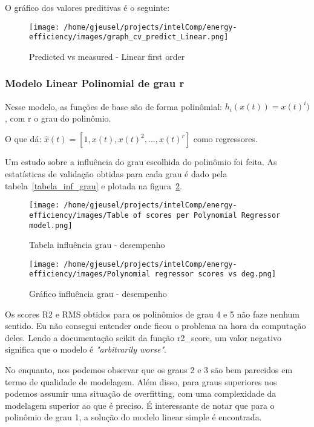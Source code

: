 \documentclass[paper=a4, fontsize=11pt]{article} %
\numberwithin{equation}{section} %
\numberwithin{figure}{section} %
\numberwithin{table}{section} %
\begin{document}
O gráfico dos valores preditivas é o seguinte:
\begin{figure}[H] %
\begin{center}
\texttt{[image: /home/gjeusel/projects/intelComp/energy-efficiency/images/graph\_cv\_predict\_Linear.png]}
\end{center}
\caption{Predicted vs measured - Linear first order}
\label{PvsM_Linear_First_Order}
\end{figure}

\subsubsection{Modelo Linear Polinomial de grau r}
Nesse modelo, as funções de base são de forma polinômial: $h_i(x(t)) = x(t)^{i})$, com r o grau do polinômio.

O que dá: $\hat{x}(t) = [1, x(t), x(t)^{2}, ..., x(t)^{r}]$ como regressores.

Um estudo sobre a influência do grau escolhida do polinômio foi feita.
As estatísticas de validação obtidas para cada grau é dado pela tabela~\ref{tabela_inf_grau} e plotada na figura~\ref{graph_inf_grau}.\newline

\begin{figure}[H] %
\begin{center}
\texttt{[image: /home/gjeusel/projects/intelComp/energy-efficiency/images/Table of scores per Polynomial Regressor model.png]}
\caption{Tabela influência grau - desempenho}
\label{tabela_inf_grau}
\bigskip
\bigskip
\texttt{[image: /home/gjeusel/projects/intelComp/energy-efficiency/images/Polynomial regressor scores vs deg.png]}
\caption{Gráfico influência grau - desempenho}
\label{graph_inf_grau}
\end{center}
\end{figure}

Os scores R2 e RMS obtidos para os polinômios de grau 4 e 5 não faze nenhum sentido.
Eu não consegui entender onde ficou o problema na hora da computação deles.
Lendo a documentação scikit da função r2\_score, um valor negativo significa que o modelo é \emph{"arbitrarily worse"}.

No enquanto, nos podemos observar que os graus 2 e 3 são bem parecidos em termo de qualidade de modelagem.
Além disso, para graus superiores nos podemos assumir uma situação de overfitting, com uma complexidade da modelagem superior ao que é preciso.\newline
É interessante de notar que para o polinômio de grau 1, a solução do modelo linear simple é encontrada.
\end{document}

